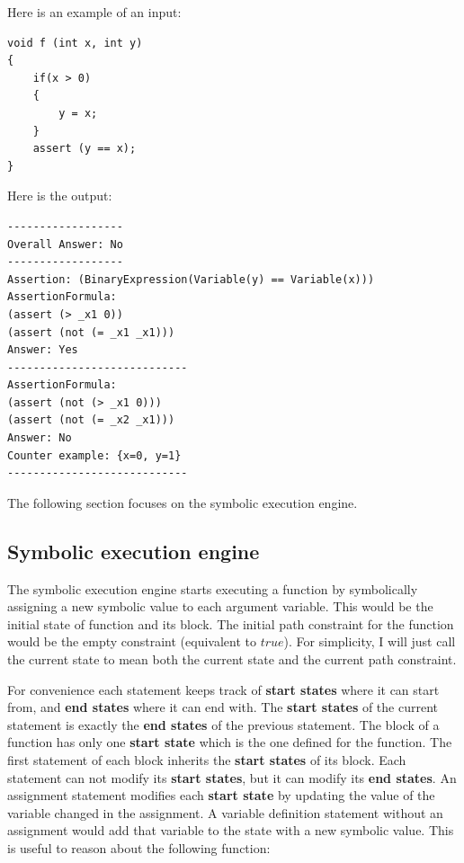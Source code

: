 \documentclass[12pt,a4paper]{article}
\begin{document}
Here is an example of an input:




\begin{lstlisting}  
void f (int x, int y)
{
    if(x > 0)
    {
        y = x;
    }
    assert (y == x);
}
\end{lstlisting}

Here is the output:


\begin{lstlisting} 
------------------
Overall Answer: No
------------------
Assertion: (BinaryExpression(Variable(y) == Variable(x)))
AssertionFormula:
(assert (> _x1 0))
(assert (not (= _x1 _x1)))
Answer: Yes
----------------------------
AssertionFormula:
(assert (not (> _x1 0)))
(assert (not (= _x2 _x1)))
Answer: No
Counter example: {x=0, y=1}
----------------------------

\end{lstlisting} 

The following section focuses on the symbolic execution engine. 

\subsection{Symbolic execution engine} \label{sec:execution}

The symbolic execution engine starts executing a function by symbolically assigning a new symbolic value to each argument variable. This would be the initial state of function and its block. The initial path constraint for the function would be the empty constraint (equivalent to $true$). For simplicity, I will just call the current state to mean both the current state and the current path constraint. 

For convenience each statement keeps track of \textbf{start states} where it can start from, and \textbf{end states} where it can end with. The \textbf{start states} of the current statement is exactly the \textbf{end states} of the previous statement. The block of a function has only one \textbf{start state} which is the one defined for the function. The first statement of each block inherits the \textbf{start states} of its block. Each statement can not modify its \textbf{start states}, but it can modify its \textbf{end states}. An assignment statement modifies each \textbf{start state} by updating the value of the variable changed in the assignment. A variable definition statement without an assignment would add that variable to the state with a new symbolic value. This is useful to reason about the following function:
\end{document}
